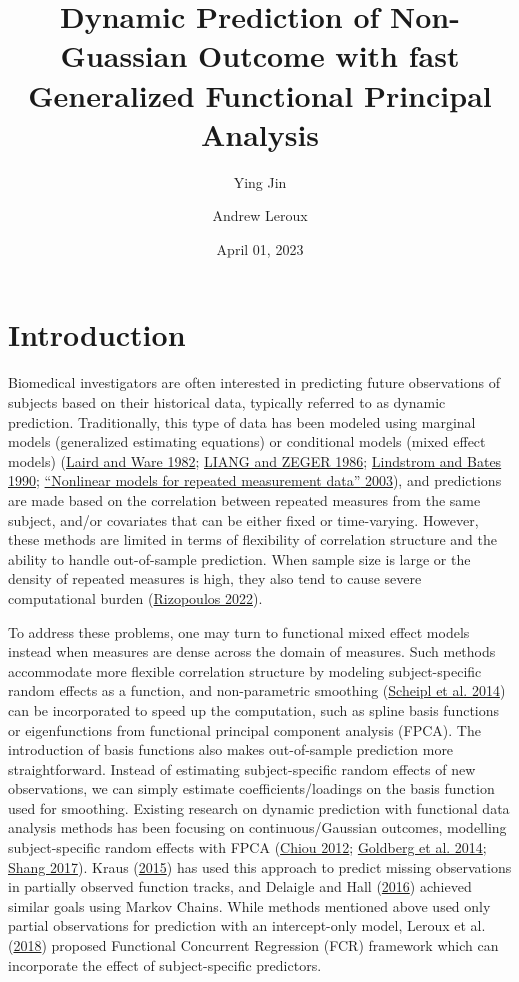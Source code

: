 \documentclass[
  11pt,
]{article}
\title{Dynamic Prediction of Non-Guassian Outcome with fast Generalized
Functional Principal Analysis}
\author{Ying Jin \and Andrew Leroux}
\date{April 01, 2023}
\begin{document}
\maketitle

\hypertarget{introduction}{%
\section{Introduction}\label{introduction}}

Biomedical investigators are often interested in predicting future
observations of subjects based on their historical data, typically
referred to as dynamic prediction. Traditionally, this type of data has
been modeled using marginal models (generalized estimating equations) or
conditional models (mixed effect models)
(\protect\hyperlink{ref-Laird1982}{Laird and Ware 1982};
\protect\hyperlink{ref-liang1986}{LIANG and ZEGER 1986};
\protect\hyperlink{ref-lindstrom1990}{Lindstrom and Bates 1990};
\protect\hyperlink{ref-davidian2003}{{``Nonlinear models for repeated
measurement data''} 2003}), and predictions are made based on the
correlation between repeated measures from the same subject, and/or
covariates that can be either fixed or time-varying. However, these
methods are limited in terms of flexibility of correlation structure and
the ability to handle out-of-sample prediction. When sample size is
large or the density of repeated measures is high, they also tend to
cause severe computational burden
(\protect\hyperlink{ref-GLMMadaptive}{Rizopoulos 2022}).

To address these problems, one may turn to functional mixed effect
models instead when measures are dense across the domain of measures.
Such methods accommodate more flexible correlation structure by modeling
subject-specific random effects as a function, and non-parametric
smoothing (\protect\hyperlink{ref-Scheipl2014}{Scheipl et al. 2014}) can
be incorporated to speed up the computation, such as spline basis
functions or eigenfunctions from functional principal component analysis
(FPCA). The introduction of basis functions also makes out-of-sample
prediction more straightforward. Instead of estimating subject-specific
random effects of new observations, we can simply estimate
coefficients/loadings on the basis function used for smoothing. Existing
research on dynamic prediction with functional data analysis methods has
been focusing on continuous/Gaussian outcomes, modelling
subject-specific random effects with FPCA
(\protect\hyperlink{ref-chiou2012}{Chiou 2012};
\protect\hyperlink{ref-goldberg2014}{Goldberg et al. 2014};
\protect\hyperlink{ref-shang2017}{Shang 2017}). Kraus
(\protect\hyperlink{ref-kraus2015}{2015}) has used this approach to
predict missing observations in partially observed function tracks, and
Delaigle and Hall (\protect\hyperlink{ref-delaigo2016}{2016}) achieved
similar goals using Markov Chains. While methods mentioned above used
only partial observations for prediction with an intercept-only model,
Leroux et al. (\protect\hyperlink{ref-leroux2016}{2018}) proposed
Functional Concurrent Regression (FCR) framework which can incorporate
the effect of subject-specific predictors.
\end{document}
